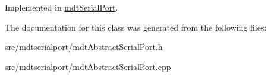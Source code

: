 Implemented in \hyperlink{classmdt_serial_port_a9d1402c229401343a3bf66eeda4fe9da}{mdtSerialPort}.



The documentation for this class was generated from the following files:\begin{DoxyCompactItemize}
\item 
src/mdtserialport/mdtAbstractSerialPort.h\item 
src/mdtserialport/mdtAbstractSerialPort.cpp\end{DoxyCompactItemize}
